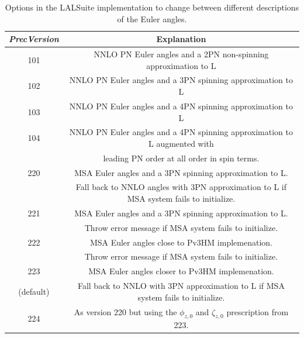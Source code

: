 \documentclass[%
aps,
prd,
amssymb,
amsmath,
amsfonts,
eqsecnum,
showpacs,
nofootinbib,
floatfix,
twocolumn,
twoside,
a4paper,
superscriptaddress
]{revtex4-1}
\begin{document}
\begin{table}[hptb]
\centering
    \begin{tabular}{ |c | c | }
\hline
\textit{PrecVersion} & Explanation \\ \hline\hline
101    & NNLO PN Euler angles and a 2PN non-spinning approximation to L \\ \hline
102     & NNLO PN Euler angles and a 3PN spinning approximation to L \\ \hline
103     & NNLO PN Euler angles and a 4PN spinning approximation to L \\ \hline
104     & NNLO PN Euler angles and a 4PN spinning approximation to L augmented with\\ & leading PN order at all order in spin terms. \\ \hline
220     &  MSA Euler angles and a 3PN spinning approximation to L. \\ & Fall back to NNLO angles with 3PN approximation to L if MSA system fails to initialize.\\ \hline
221     &  MSA Euler angles and a 3PN spinning approximation to L. \\ & Throw error message if MSA system fails to initialize.\\ \hline
222     &  MSA Euler angles close to Pv3HM implemenation. \\& Throw error message if MSA system fails to initialize.\\ \hline
223     & MSA Euler angles closer to Pv3HM implemenation. \\ (default) & Fall back to NNLO with 3PN approximation to L if MSA system fails to initialize. \\ \hline
224   & As version 220 but using the $\phi_{z,0}$ and $\zeta_{z,0}$ prescription from 223. \\ \hline
\end{tabular}
    \caption{Options in the LALSuite implementation to change between different descriptions of the Euler angles. }
    \label{tab:prec_version}

\vspace{2\baselineskip}


\end{table}
\end{document}
